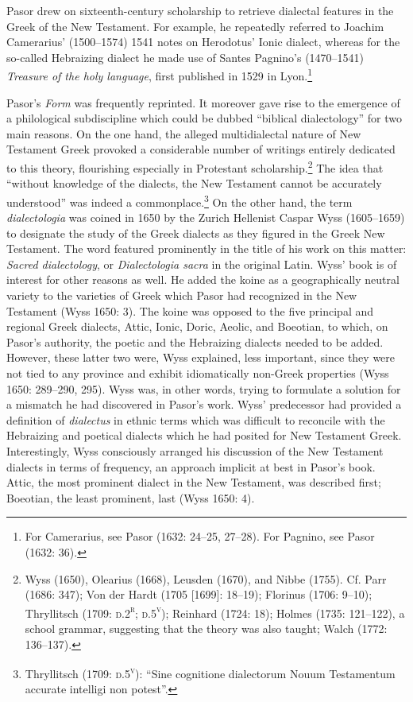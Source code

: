 \documentclass[12pt]{article}
\newenvironment{styleStandard}{\renewcommand\baselinestretch{1.25}\setlength\leftskip{0in}\setlength\rightskip{0in}\setlength\parindent{0.1972in}\setlength\parfillskip{0pt plus 1fil}\setlength\parskip{0in plus 1pt}\writerlistparindent\writerlistleftskip\leavevmode\normalfont\normalsize\writerlistlabel\ignorespaces}{\unskip\vspace{0in plus 1pt}\par}
\newcommand\writerlistleftskip{}
\newcommand\writerlistparindent{}
\newcommand\writerlistlabel{}
\begin{document}
\begin{styleStandard}
Pasor drew on sixteenth-century scholarship to retrieve dialectal features in the Greek of the New Testament. For example, he repeatedly referred to Joachim Camerarius’ (1500–1574) 1541 notes on Herodotus’ Ionic dialect, whereas for the so-called Hebraizing dialect he made use of Santes Pagnino’s (1470–1541) \textit{Treasure of the holy language}, first published in 1529 in Lyon.\footnote{ For Camerarius, see Pasor (1632: 24–25, 27–28). For Pagnino, see Pasor (1632: 36).}
\end{styleStandard}

\begin{styleStandard}
Pasor’s \textit{Form} was frequently reprinted. It moreover gave rise to the emergence of a philological subdiscipline which could be dubbed “biblical dialectology” for two main reasons. On the one hand, the alleged multidialectal nature of New Testament Greek provoked a considerable number of writings entirely dedicated to this theory, flourishing especially in Protestant scholarship.\footnote{ Wyss (1650), Olearius (1668), Leusden (1670), and Nibbe (1755). Cf. Parr (1686: 347); Von der Hardt (1705 [1699]: 18–19); Florinus (1706: 9–10); Thryllitsch (1709: \textsc{d.2}\textsc{\textsuperscript{r}}; \textsc{d.5}\textsc{\textsuperscript{v}}); Reinhard (1724: 18); Holmes (1735: 121–122), a school grammar, suggesting that the theory was also taught; Walch (1772: 136–137).} The idea that “without knowledge of the dialects, the New Testament cannot be accurately understood” was indeed a commonplace.\footnote{ Thryllitsch (1709: \textsc{d.5}\textsc{\textsuperscript{v}}): “Sine cognitione dialectorum Nouum Testamentum accurate intelligi non potest”.} On the other hand, the term \textit{dialectologia} was coined in 1650 by the Zurich Hellenist Caspar Wyss (1605–1659) to designate the study of the Greek dialects as they figured in the Greek New Testament. The word featured prominently in the title of his work on this matter: \textit{Sacred dialectology}, or \textit{Dialectologia sacra} in the original Latin. Wyss’ book is of interest for other reasons as well. He added the koine as a geographically neutral variety to the varieties of Greek which Pasor had recognized in the New Testament (Wyss 1650: 3). The koine was opposed to the five principal and regional Greek dialects, Attic, Ionic, Doric, Aeolic, and Boeotian, to which, on Pasor’s authority, the poetic and the Hebraizing dialects needed to be added. However, these latter two were, Wyss explained, less important, since they were not tied to any province and exhibit idiomatically non-Greek properties (Wyss 1650: 289–290, 295). Wyss was, in other words, trying to formulate a solution for a mismatch he had discovered in Pasor’s work. Wyss’ predecessor had provided a definition of \textit{dialectus }in ethnic terms which was difficult to reconcile with the Hebraizing and poetical dialects which he had posited for New Testament Greek. Interestingly, Wyss consciously arranged his discussion of the New Testament dialects in terms of frequency, an approach implicit at best in Pasor’s book. Attic, the most prominent dialect in the New Testament, was described first; Boeotian, the least prominent, last (Wyss 1650: 4).

\end{styleStandard}
\end{document}
